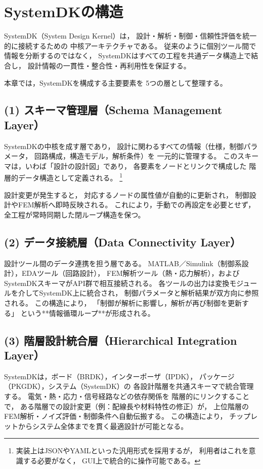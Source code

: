 \section{SystemDKの構造}

SystemDK（System Design Kernel）は，
設計・解析・制御・信頼性評価を統一的に接続するための
中核アーキテクチャである。
従来のように個別ツール間で情報を分断するのではなく，
SystemDKはすべての工程を共通データ構造上で結合し，
設計情報の一貫性・整合性・再利用性を保証する。

本章では，SystemDKを構成する主要要素を
5つの層として整理する。

\subsection{(1) スキーマ管理層（Schema Management Layer）}
SystemDKの中核を成す層であり，
設計に関わるすべての情報（仕様，制御パラメータ，
回路構成，構造モデル，解析条件）を
一元的に管理する。
このスキーマは，いわば「設計の設計図」であり，
各要素をノードとリンクで構成した
階層的データ構造として定義される。
\footnote{実装上はJSONやYAMLといった汎用形式を採用するが，
利用者はこれを意識する必要がなく，
GUI上で統合的に操作可能である。}

設計変更が発生すると，
対応するノードの属性値が自動的に更新され，
制御設計やFEM解析へ即時反映される。
これにより，手動での再設定を必要とせず，
全工程が常時同期した閉ループ構造を保つ。

\subsection{(2) データ接続層（Data Connectivity Layer）}
設計ツール間のデータ連携を担う層である。
MATLAB／Simulink（制御系設計），EDAツール（回路設計），
FEM解析ツール（熱・応力解析），および
SystemDKスキーマがAPI群で相互接続される。
各ツールの出力は変換モジュールを介してSystemDK上に統合され，
制御パラメータと解析結果が双方向に参照される。
この構造により，
「制御が解析に影響し，解析が再び制御を更新する」
という**情報循環ループ**が形成される。

\subsection{(3) 階層設計統合層（Hierarchical Integration Layer）}
SystemDKは，ボード（BRDK），インターポーザ（IPDK），
パッケージ（PKGDK），システム（SystemDK）の
各設計階層を共通スキーマで統合管理する。
電気・熱・応力・信号経路などの依存関係を
階層的にリンクすることで，
ある階層での設計変更（例：配線長や材料特性の修正）が，
上位階層のFEM解析・ノイズ評価・制御条件へ自動伝搬する。
この構造により，
チップレットからシステム全体までを貫く最適設計が可能となる。


